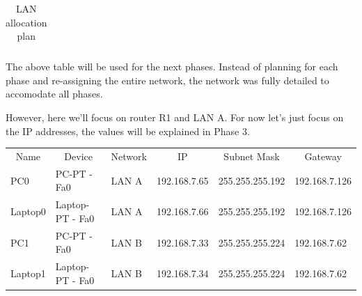 \documentclass[11pt,a4paper]{report}
\begin{document}
\begin{table}[]
\begin{tabular}{rlcccccccccccccccclllllllllll}
\end{tabular}
\caption{LAN allocation plan}
\label{tab:lanalloc}
\end{table}

The above table will be used for the next phases. Instead of planning for each phase and re-assigning the entire network, the network was fully detailed to accomodate all phases.

However, here we'll focus on router R1 and LAN A. For now let's just focus on the IP addresses, the values will be explained in Phase 3.

\begin{table}[]
\begin{tabular}{llllll}
\multicolumn{1}{c}{\multirow{2}{*}{Name}} & \multicolumn{1}{c}{\multirow{2}{*}{Device}} & \multicolumn{1}{c}{\multirow{2}{*}{Network}} & \multicolumn{1}{c}{\multirow{2}{*}{IP}} & \multicolumn{1}{c}{\multirow{2}{*}{Subnet Mask}} & \multicolumn{1}{c}{\multirow{2}{*}{Gateway}} \\
\multicolumn{1}{c}{}                      & \multicolumn{1}{c}{}                        & \multicolumn{1}{c}{}                         & \multicolumn{1}{c}{}                    & \multicolumn{1}{c}{}                             & \multicolumn{1}{c}{}                         \\ \hline
PC0                                       & PC-PT - Fa0                                 & LAN A                                        & 192.168.7.65                            & 255.255.255.192                                  & 192.168.7.126                                \\ \hline
Laptop0                                   & Laptop-PT - Fa0                             & LAN A                                        & 192.168.7.66                            & 255.255.255.192                                  & 192.168.7.126                                \\ \hline
PC1                                       & PC-PT - Fa0                                 & LAN B                                        & 192.168.7.33                            & 255.255.255.224                                  & 192.168.7.62                                 \\ \hline
Laptop1                                   & Laptop-PT - Fa0                             & LAN B                                        & 192.168.7.34                            & 255.255.255.224                                  & 192.168.7.62                                 \\ \hline

\end{tabular}
\end{table}
\end{document}
